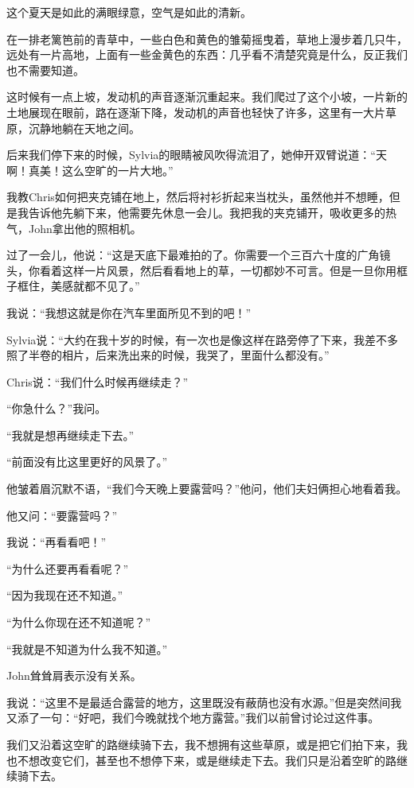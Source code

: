 \documentclass[UTF8]{article}
\begin{document}
\par 这个夏天是如此的满眼绿意，空气是如此的清新。
\par 在一排老篱笆前的青草中，一些白色和黄色的雏菊摇曳着，草地上漫步着几只牛，远处有一片高地，上面有一些金黄色的东西：几乎看不清楚究竟是什么，反正我们也不需要知道。
\par 这时候有一点上坡，发动机的声音逐渐沉重起来。我们爬过了这个小坡，一片新的土地展现在眼前，路在逐渐下降，发动机的声音也轻快了许多，这里有一大片草原，沉静地躺在天地之间。
\par 后来我们停下来的时候，Sylvia的眼睛被风吹得流泪了，她伸开双臂说道：“天啊！真美！这么空旷的一片大地。”
\par 我教Chris如何把夹克铺在地上，然后将衬衫折起来当枕头，虽然他并不想睡，但是我告诉他先躺下来，他需要先休息一会儿。我把我的夹克铺开，吸收更多的热气，John拿出他的照相机。
\par 过了一会儿，他说：“这是天底下最难拍的了。你需要一个三百六十度的广角镜头，你看着这样一片风景，然后看看地上的草，一切都妙不可言。但是一旦你用框子框住，美感就都不见了。”
\par 我说：“我想这就是你在汽车里面所见不到的吧！”
\par Sylvia说：“大约在我十岁的时候，有一次也是像这样在路旁停了下来，我差不多照了半卷的相片，后来洗出来的时候，我哭了，里面什么都没有。”
\par Chris说：“我们什么时候再继续走？”
\par “你急什么？”我问。
\par “我就是想再继续走下去。”
\par “前面没有比这里更好的风景了。”
\par 他皱着眉沉默不语，“我们今天晚上要露营吗？”他问，他们夫妇俩担心地看着我。
\par 他又问：“要露营吗？”
\par 我说：“再看看吧！”
\par “为什么还要再看看呢？”
\par “因为我现在还不知道。”
\par “为什么你现在还不知道呢？”
\par “我就是不知道为什么我不知道。”
\par John耸耸肩表示没有关系。
\par 我说：“这里不是最适合露营的地方，这里既没有蔽荫也没有水源。”但是突然间我又添了一句：“好吧，我们今晚就找个地方露营。”我们以前曾讨论过这件事。
\par 我们又沿着这空旷的路继续骑下去，我不想拥有这些草原，或是把它们拍下来，我也不想改变它们，甚至也不想停下来，或是继续走下去。我们只是沿着空旷的路继续骑下去。
\end{document}
